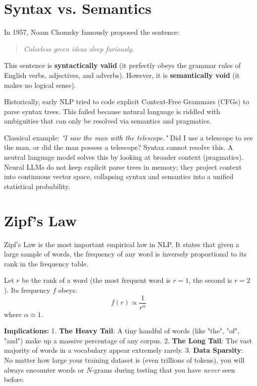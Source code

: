 \section{Syntax vs. Semantics}

In 1957, Noam Chomsky famously proposed the sentence:
\begin{quote}
    \textit{Colorless green ideas sleep furiously.}
\end{quote}

This sentence is \textbf{syntactically valid} (it perfectly obeys the grammar rules of English verbs, adjectives, and adverbs). However, it is \textbf{semantically void} (it makes no logical sense).

Historically, early NLP tried to code explicit Context-Free Grammars (CFGs) to parse syntax trees. This failed because natural language is riddled with ambiguities that can only be resolved via semantics and pragmatics. 

Classical example: \textit{"I saw the man with the telescope."} 
Did I use a telescope to see the man, or did the man possess a telescope? Syntax cannot resolve this. A neutral language model solves this by looking at broader context (pragmatics). Neural LLMs do not keep explicit parse trees in memory; they project context into continuous vector space, collapsing syntax and semantics into a unified statistical probability.

\section{Zipf's Law}

Zipf's Law is the most important empirical law in NLP. It states that given a large sample of words, the frequency of any word is inversely proportional to its rank in the frequency table.

Let $r$ be the rank of a word (the most frequent word is $r=1$, the second is $r=2$). Its frequency $f$ obeys:
\begin{equation}
f(r) \propto \frac{1}{r^\alpha}
\end{equation}
where $\alpha \approx 1$.

\textbf{Implications:}
1. \textbf{The Heavy Tail}: A tiny handful of words (like "the", "of", "and") make up a massive percentage of any corpus.
2. \textbf{The Long Tail}: The vast majority of words in a vocabulary appear extremely rarely. 
3. \textbf{Data Sparsity}: No matter how large your training dataset is (even trillions of tokens), you will always encounter words or $N$-grams during testing that you have \emph{never} seen before. 

